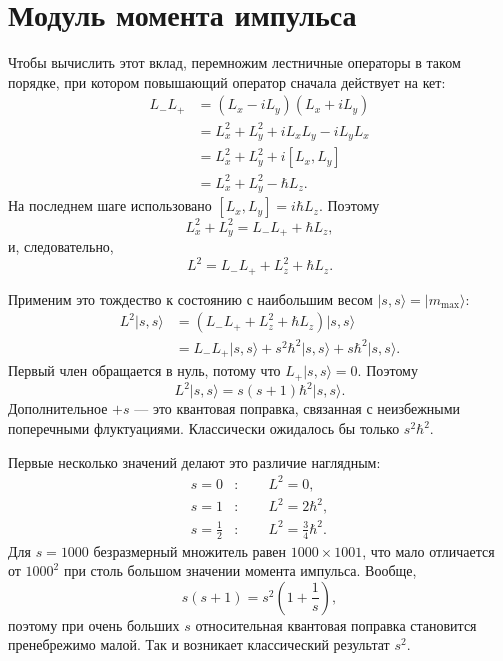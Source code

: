 \section{Модуль момента импульса}

\begin{classroomqa}
\end{classroomqa}

Чтобы вычислить этот вклад, перемножим лестничные операторы в таком порядке, при котором повышающий оператор сначала действует на кет:
\begin{align}
L_-L_+
&=(L_x-iL_y)(L_x+iL_y) \\
&=L_x^2+L_y^2+iL_xL_y-iL_yL_x \\
&=L_x^2+L_y^2+i[L_x,L_y] \\
&=L_x^2+L_y^2-\hbar L_z.
\end{align}
На последнем шаге использовано \([L_x,L_y]=i\hbar L_z\). Поэтому
\begin{equation}
L_x^2+L_y^2=L_-L_++\hbar L_z,
\end{equation}
и, следовательно,
\begin{equation}
L^2=L_-L_++L_z^2+\hbar L_z.
\end{equation}

Применим это тождество к состоянию с наибольшим весом \(\lvert s,s\rangle=\lvert m_{\max}\rangle\):
\begin{align}
L^2\lvert s,s\rangle
&=\left(L_-L_++L_z^2+\hbar L_z\right)\lvert s,s\rangle \\
&=L_-L_+\lvert s,s\rangle
+s^2\hbar^2\lvert s,s\rangle
+s\hbar^2\lvert s,s\rangle.
\end{align}
Первый член обращается в нуль, потому что \(L_+\lvert s,s\rangle=0\). Поэтому
\begin{equation}
L^2\lvert s,s\rangle
=s(s+1)\hbar^2\lvert s,s\rangle.
\end{equation}
Дополнительное \(+s\) — это квантовая поправка, связанная с неизбежными поперечными флуктуациями. Классически ожидалось бы только \(s^2\hbar^2\).

Первые несколько значений делают это различие наглядным:
\begin{align}
s=0 &: \qquad L^2=0,\\
s=1 &: \qquad L^2=2\hbar^2,\\
s=\frac12 &: \qquad L^2=\frac34\hbar^2.
\end{align}
Для \(s=1000\) безразмерный множитель равен \(1000\times1001\), что мало отличается от \(1000^2\) при столь большом значении момента импульса. Вообще,
\begin{equation}
s(s+1)=s^2\left(1+\frac1s\right),
\end{equation}
поэтому при очень больших \(s\) относительная квантовая поправка становится пренебрежимо малой. Так и возникает классический результат \(s^2\).

